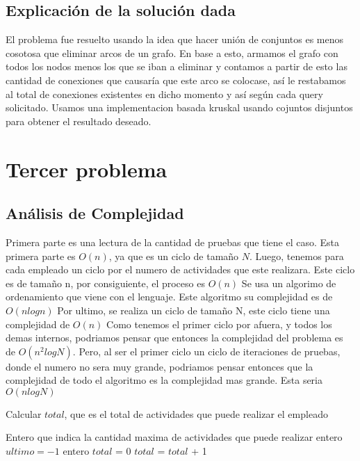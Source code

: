 \documentclass[a4paper,10pt]{article}
\begin{document}
\subsection{Explicación de la solución dada}
\hspace{2cm}El problema fue resuelto usando la idea que hacer unión de conjuntos es menos cosotosa que eliminar arcos de un grafo. En base a esto, armamos el grafo con todos los nodos menos los que se iban a eliminar y contamos a partir de esto las cantidad de conexiones que causaría  que este arco se colocase, así le restabamos al total de conexiones existentes en dicho momento y así según cada query solicitado. Usamos una implementacion basada kruskal usando cojuntos disjuntos para obtener el resultado deseado.
\section{Tercer problema}
\subsection{Análisis de Complejidad}
\hspace{2cm}Primera parte es una lectura de la cantidad de pruebas que tiene el caso.
  Esta primera parte es {$O(n)$}, ya que es un ciclo de tamaño {$N$}.
  Luego, tenemos para cada empleado un ciclo por el numero de actividades que este realizara.
  Este ciclo es de tamaño n, por consiguiente, el proceso es {$O(n)$}
  Se usa un algorimo de ordenamiento que viene con el lenguaje. Este algoritmo su complejidad es de {$O(nlogn)$}
  Por ultimo, se realiza un ciclo de tamaño N, este ciclo tiene una complejidad de {$O(n)$}
  Como tenemos el primer ciclo por afuera, y todos los demas internos, podriamos pensar que entonces 
  la complejidad del problema es de {$ O(n^{2}log N)$}. 
  Pero, al ser el primer ciclo un ciclo de iteraciones de pruebas, donde el numero no sera muy grande, 
  podriamos pensar entonces que la complejidad de todo el algoritmo es la complejidad mas grande. 
  Esta seria {$O(nlogN)$}
 
\begin{algorithm}                      %
\caption{Calcular $total$, que es el total de actividades que puede realizar el empleado}          %
\label{Problema 3}                           %
\begin{algorithmic}[1]                    %
    \ENSURE Entero que indica la cantidad maxima de actividades que puede realizar
    \STATE entero {$ultimo = -1$}
    \STATE entero {$total$ = $0$}
	\STATE $total$ = $total$ + 1 
	\ENDIF
    \ENDFOR
\end{algorithmic}
\end{algorithm}
\end{document}

